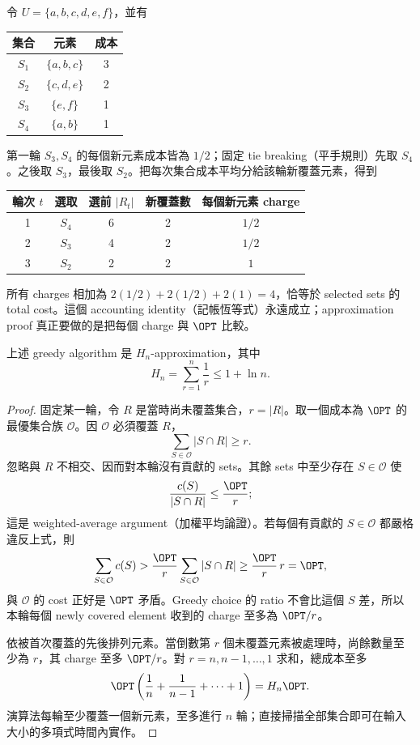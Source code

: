 \documentclass[11pt,a4paper,oneside,openany]{book}
\begin{document}
\begin{example}
令 $U=\{a,b,c,d,e,f\}$，並有
\begin{center}
\begin{tabular}{@{}ccc@{}}
\toprule
集合 & 元素 & 成本 \\
\midrule
$S_1$ & $\{a,b,c\}$ & 3 \\
$S_2$ & $\{c,d,e\}$ & 2 \\
$S_3$ & $\{e,f\}$ & 1 \\
$S_4$ & $\{a,b\}$ & 1 \\
\bottomrule
\end{tabular}
\end{center}
第一輪 $S_3,S_4$ 的每個新元素成本皆為 $1/2$；固定 tie breaking（平手規則）先取 $S_4$。之後取 $S_3$，最後取 $S_2$。把每次集合成本平均分給該輪新覆蓋元素，得到
\begin{center}
\begin{tabular}{@{}ccccc@{}}
\toprule
輪次 $t$ & 選取 & 選前 $|R_t|$ & 新覆蓋數 & 每個新元素 charge \\
\midrule
1 & $S_4$ & 6 & 2 & $1/2$ \\
2 & $S_3$ & 4 & 2 & $1/2$ \\
3 & $S_2$ & 2 & 2 & $1$ \\
\bottomrule
\end{tabular}
\end{center}
所有 charges 相加為 $2(1/2)+2(1/2)+2(1)=4$，恰等於 selected sets 的 total cost。這個 accounting identity（記帳恆等式）永遠成立；approximation proof 真正要做的是把每個 charge 與 $\OPT$ 比較。
\end{example}

\begin{theorem}
上述 greedy algorithm 是 $H_n$-approximation，其中
\[
 H_n=\sum_{r=1}^{n}\frac1r\le1+\ln n.
\]
\end{theorem}
\begin{proof}
固定某一輪，令 $R$ 是當時尚未覆蓋集合，$r=|R|$。取一個成本為 $\OPT$ 的最優集合族 $\mathcal O$。因 $\mathcal O$ 必須覆蓋 $R$，
\[
 \sum_{S\in\mathcal O}|S\cap R|\ge r.
\]
忽略與 $R$ 不相交、因而對本輪沒有貢獻的 sets。其餘 sets 中至少存在 $S\in\mathcal O$ 使
\[
 \frac{c(S)}{|S\cap R|}\le\frac{\OPT}{r};
\]
這是 weighted-average argument（加權平均論證）。若每個有貢獻的 $S\in\mathcal O$ 都嚴格違反上式，則
\[
 \sum_{S\in\mathcal O}c(S)
 >\frac{\OPT}{r}\sum_{S\in\mathcal O}|S\cap R|
 \ge\frac{\OPT}{r}\,r=\OPT,
\]
與 $\mathcal O$ 的 cost 正好是 $\OPT$ 矛盾。Greedy choice 的 ratio 不會比這個 $S$ 差，所以本輪每個 newly covered element 收到的 charge 至多為 $\OPT/r$。

依被首次覆蓋的先後排列元素。當倒數第 $r$ 個未覆蓋元素被處理時，尚餘數量至少為 $r$，其 charge 至多 $\OPT/r$。對 $r=n,n-1,\ldots,1$ 求和，總成本至多
\[
 \OPT\left(\frac1n+\frac1{n-1}+\cdots+1\right)=H_n\OPT.
\]
演算法每輪至少覆蓋一個新元素，至多進行 $n$ 輪；直接掃描全部集合即可在輸入大小的多項式時間內實作。
\end{proof}
\end{document}
